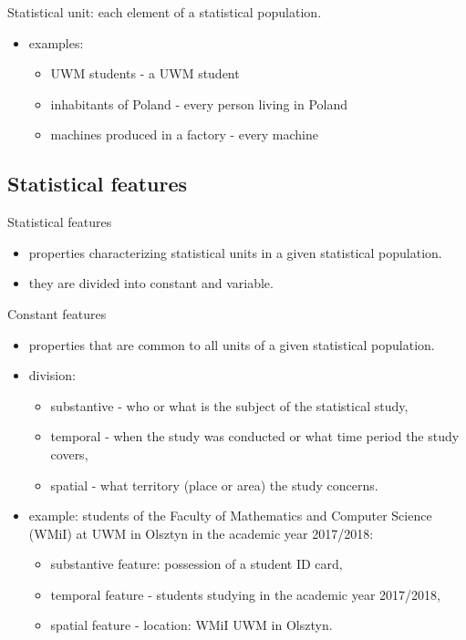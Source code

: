 \documentclass[
  english,
  letterpaper,
  DIV=11,
  numbers=noendperiod]{scrreprt}
\providecommand{\tightlist}{%
  \setlength{\itemsep}{0pt}\setlength{\parskip}{0pt}}
\begin{document}
Statistical unit: each element of a statistical population.

\begin{itemize}
\tightlist
\item
  examples:

  \begin{itemize}
  \tightlist
  \item
    UWM students - a UWM student
  \item
    inhabitants of Poland - every person living in Poland
  \item
    machines produced in a factory - every machine
  \end{itemize}
\end{itemize}

\subsection{Statistical features}\label{statistical-features}

Statistical features

\begin{itemize}
\tightlist
\item
  properties characterizing statistical units in a given statistical
  population.
\item
  they are divided into constant and variable.
\end{itemize}

Constant features

\begin{itemize}
\tightlist
\item
  properties that are common to all units of a given statistical
  population.
\item
  division:

  \begin{itemize}
  \tightlist
  \item
    substantive - who or what is the subject of the statistical study,
  \item
    temporal - when the study was conducted or what time period the
    study covers,
  \item
    spatial - what territory (place or area) the study concerns.
  \end{itemize}
\item
  example: students of the Faculty of Mathematics and Computer Science
  (WMiI) at UWM in Olsztyn in the academic year 2017/2018:

  \begin{itemize}
  \tightlist
  \item
    substantive feature: possession of a student ID card,
  \item
    temporal feature - students studying in the academic year 2017/2018,
  \item
    spatial feature - location: WMiI UWM in Olsztyn.
  \end{itemize}
\end{itemize}
\end{document}
